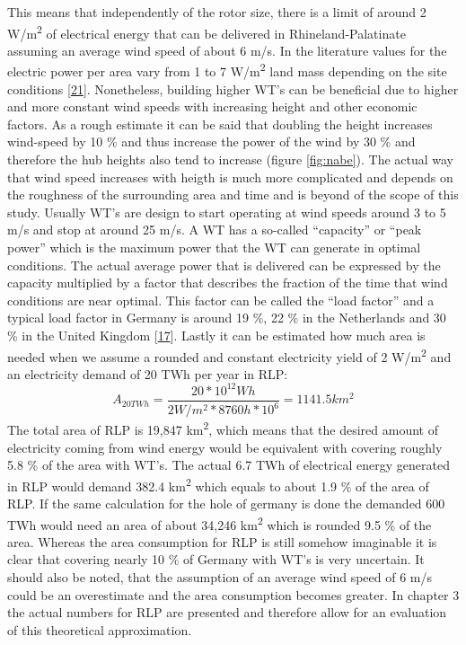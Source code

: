 \documentclass[a4paper,11pt]{article}
\begin{document}
This means that independently of the rotor size, there is a limit of around 2 W/m\textsuperscript{2} of electrical energy that can be delivered in Rhineland-Palatinate assuming an average wind speed of about 6 m/s. In the literature values for the electric power per area vary from 1 to 7 W/m\textsuperscript{2} land mass depending on the site conditions {[}\protect\hyperlink{ref-SvenLinow.2020}{21}{]}. Nonetheless, building higher WT's can be beneficial due to higher and more constant wind speeds with increasing height and other economic factors. As a rough estimate it can be said that doubling the height increases wind-speed by 10 \% and thus increase the power of the wind by 30 \% and therefore the hub heights also tend to increase (figure \ref{fig:nabe}). The actual way that wind speed increases with heigth is much more complicated and depends on the roughness of the surrounding area and time and is beyond of the scope of this study. Usually WT's are design to start operating at wind speeds around 3 to 5 m/s and stop at around 25 m/s. A WT has a so-called ``capacity'' or ``peak power'' which is the maximum power that the WT can generate in optimal conditions. The actual average power that is delivered can be expressed by the capacity multiplied by a factor that describes the fraction of the time that wind conditions are near optimal. This factor can be called the ``load factor'' and a typical load factor in Germany is around 19 \%, 22 \% in the Netherlands and 30 \% in the United Kingdom {[}\protect\hyperlink{ref-DavidJCMacKay.2009}{17}{]}. Lastly it can be estimated how much area is needed when we assume a rounded and constant electricity yield of 2 W/m\textsuperscript{2} and an electricity demand of 20 TWh per year in RLP:
\begin{equation}
A_{20TWh}=\frac{20 * 10^{12} Wh}{2W/m^2 * 8760h * 10^6}=1141.5km^2
\end{equation}
The total area of RLP is 19,847 km\textsuperscript{2}, which means that the desired amount of electricity coming from wind energy would be equivalent with covering roughly 5.8 \% of the area with WT's. The actual 6.7 TWh of electrical energy generated in RLP would demand 382.4 km\textsuperscript{2} which equals to about 1.9 \% of the area of RLP. If the same calculation for the hole of germany is done the demanded 600 TWh would need an area of about 34,246 km\textsuperscript{2} which is rounded 9.5 \% of the area. Whereas the area consumption for RLP is still somehow imaginable it is clear that covering nearly 10 \% of Germany with WT's is very uncertain. It should also be noted, that the assumption of an average wind speed of 6 m/s could be an overestimate and the area consumption becomes greater. In chapter 3 the actual numbers for RLP are presented and therefore allow for an evaluation of this theoretical approximation.
\end{document}
